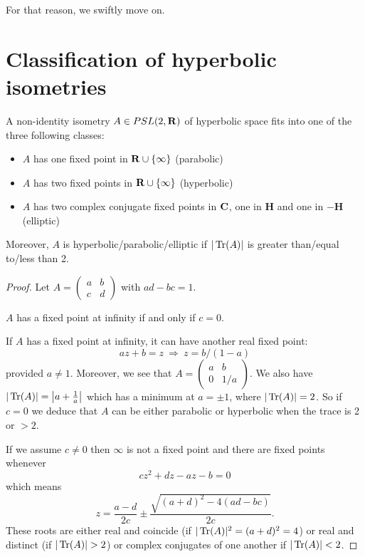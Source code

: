 \documentclass[12pt]{article}
\begin{document}
For that reason, we swiftly move on.

\section{Classification of hyperbolic isometries}

\begin{thm}
  A non-identity isometry $A\in PSL(2,\mathbf{R})$ of hyperbolic space fits into one of the three following classes:
  \begin{itemize}
  \item $A$ has one fixed point in $\mathbf{R}\cup\{\infty\}$ (parabolic)
  \item $A$ has two fixed points in $\mathbf{R}\cup\{\infty\}$ (hyperbolic)
  \item $A$ has two complex conjugate fixed points in $\mathbf{C}$, one in $\mathbf{H}$ and one in $-\mathbf{H}$ (elliptic)
  \end{itemize}
  Moreover, $A$ is hyperbolic/parabolic/elliptic if $|\operatorname{Tr}(A)|$ is greater than/equal to/less than 2.
\end{thm}
\begin{proof}
  Let $A=\left(\begin{array}{cc}a&b\\ c&d\end{array}\right)$ with $ad-bc=1$.
  
  $A$ has a fixed point at infinity if and only if $c=0$.

  If $A$ has a fixed point at infinity, it can have another real fixed point:
  \[az+b=z\ \Rightarrow\ z=b/(1-a)\]
  provided $a\neq 1$. Moreover, we see that $A=\left(\begin{array}{cc}a & b\\ 0 & 1/a\end{array}\right)$. We also have $|\operatorname{Tr}(A)|=\left|a+\frac{1}{a}\right|$ which has a minimum at $a=\pm 1$, where $|\operatorname{Tr}(A)|=2$. So if $c=0$ we deduce that $A$ can be either parabolic or hyperbolic when the trace is 2 or $>2$.

    If we assume $c\neq 0$ then $\infty$ is not a fixed point and there are fixed points whenever
    \[cz^2+dz-az-b=0\]
    which means
    \[z=\frac{a-d}{2c}\pm\frac{\sqrt{(a+d)^2-4(ad-bc)}}{2c}.\]
    These roots are either real and coincide (if $|\operatorname{Tr}(A)|^2=(a+d)^2=4$) or real and distinct (if $|\OP{Tr}(A)|>2$) or complex conjugates of one another if $|\operatorname{Tr}(A)|<2$.
\end{proof}
\end{document}
